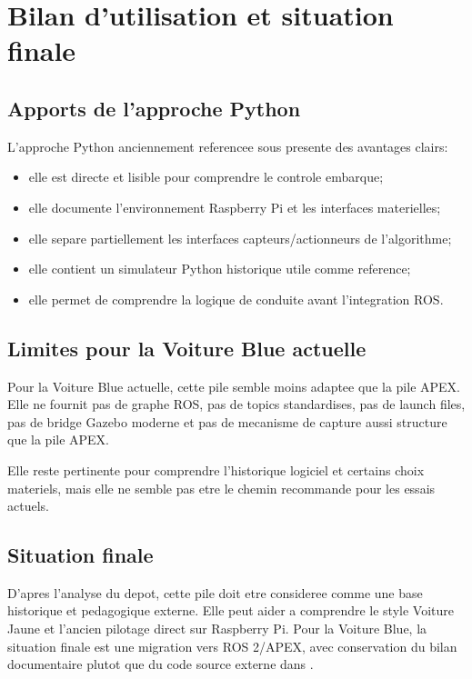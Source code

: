 \section{Bilan d'utilisation et situation finale}

\subsection{Apports de l'approche Python}

L'approche Python anciennement referencee sous  presente des avantages clairs:

\begin{itemize}
  \item elle est directe et lisible pour comprendre le controle embarque;
  \item elle documente l'environnement Raspberry Pi et les interfaces materielles;
  \item elle separe partiellement les interfaces capteurs/actionneurs de l'algorithme;
  \item elle contient un simulateur Python historique utile comme reference;
  \item elle permet de comprendre la logique de conduite avant l'integration ROS.
\end{itemize}

\subsection{Limites pour la Voiture Blue actuelle}

Pour la Voiture Blue actuelle, cette pile semble moins adaptee que la pile APEX. Elle ne fournit pas de graphe ROS, pas de topics standardises, pas de launch files, pas de bridge Gazebo moderne et pas de mecanisme de capture aussi structure que la pile APEX.

Elle reste pertinente pour comprendre l'historique logiciel et certains choix materiels, mais elle ne semble pas etre le chemin recommande pour les essais actuels.

\subsection{Situation finale}

D'apres l'analyse du depot, cette pile doit etre consideree comme une base historique et pedagogique externe. Elle peut aider a comprendre le style Voiture Jaune et l'ancien pilotage direct sur Raspberry Pi. Pour la Voiture Blue, la situation finale est une migration vers ROS 2/APEX, avec conservation du bilan documentaire plutot que du code source externe dans .
